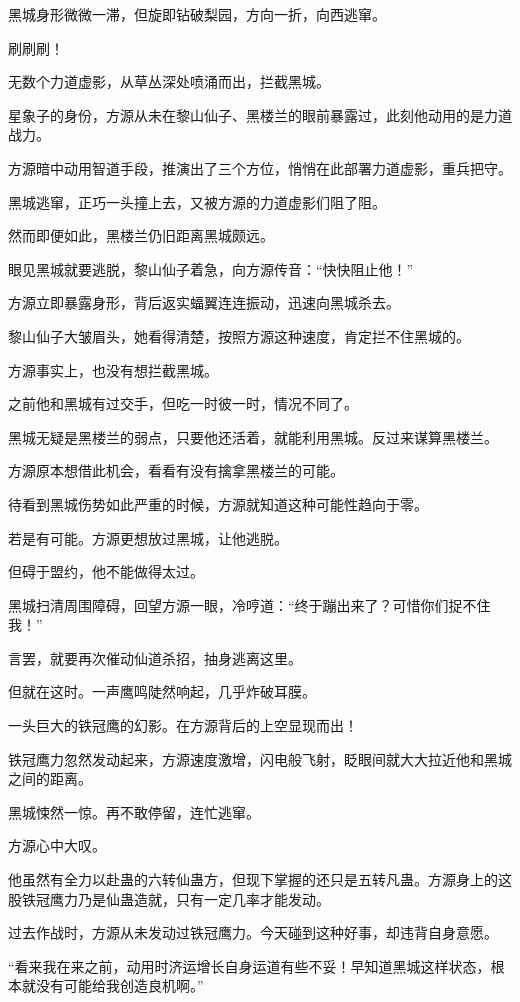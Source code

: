\begin{this_body}
黑城身形微微一滞，但旋即钻破梨园，方向一折，向西逃窜。

刷刷刷！

无数个力道虚影，从草丛深处喷涌而出，拦截黑城。

星象子的身份，方源从未在黎山仙子、黑楼兰的眼前暴露过，此刻他动用的是力道战力。

方源暗中动用智道手段，推演出了三个方位，悄悄在此部署力道虚影，重兵把守。

黑城逃窜，正巧一头撞上去，又被方源的力道虚影们阻了阻。

然而即便如此，黑楼兰仍旧距离黑城颇远。

眼见黑城就要逃脱，黎山仙子着急，向方源传音：“快快阻止他！”

方源立即暴露身形，背后返实蝠翼连连振动，迅速向黑城杀去。

黎山仙子大皱眉头，她看得清楚，按照方源这种速度，肯定拦不住黑城的。

方源事实上，也没有想拦截黑城。

之前他和黑城有过交手，但吃一时彼一时，情况不同了。

黑城无疑是黑楼兰的弱点，只要他还活着，就能利用黑城。反过来谋算黑楼兰。

方源原本想借此机会，看看有没有擒拿黑楼兰的可能。

待看到黑城伤势如此严重的时候，方源就知道这种可能性趋向于零。

若是有可能。方源更想放过黑城，让他逃脱。

但碍于盟约，他不能做得太过。

黑城扫清周围障碍，回望方源一眼，冷哼道：“终于蹦出来了？可惜你们捉不住我！”

言罢，就要再次催动仙道杀招，抽身逃离这里。

但就在这时。一声鹰鸣陡然响起，几乎炸破耳膜。

一头巨大的铁冠鹰的幻影。在方源背后的上空显现而出！

铁冠鹰力忽然发动起来，方源速度激增，闪电般飞射，眨眼间就大大拉近他和黑城之间的距离。

黑城悚然一惊。再不敢停留，连忙逃窜。

方源心中大叹。

他虽然有全力以赴蛊的六转仙蛊方，但现下掌握的还只是五转凡蛊。方源身上的这股铁冠鹰力乃是仙蛊造就，只有一定几率才能发动。

过去作战时，方源从未发动过铁冠鹰力。今天碰到这种好事，却违背自身意愿。

“看来我在来之前，动用时济运增长自身运道有些不妥！早知道黑城这样状态，根本就没有可能给我创造良机啊。”


\end{this_body}
